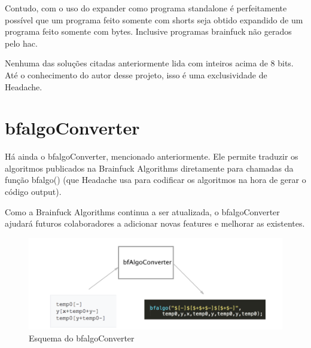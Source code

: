 Contudo, com o uso do expander como programa standalone é perfeitamente possível que um programa feito somente com shorts seja obtido expandido de um programa feito somente com bytes. Inclusive programas brainfuck não gerados pelo hac.

Nenhuma das soluções citadas anteriormente lida com inteiros acima de 8 bits. Até o conhecimento do autor desse projeto, isso é uma exclusividade de Headache.

\section{bfalgoConverter}

Há ainda o bfalgoConverter, mencionado anteriormente. Ele permite traduzir os algoritmos publicados na Brainfuck Algorithms diretamente para chamadas da função bfalgo() (que Headache usa para codificar os algoritmos na hora de gerar o código output).

Como a Brainfuck Algorithms continua a ser atualizada, o bfalgoConverter ajudará futuros colaboradores a adicionar novas features e melhorar as existentes.

\begin{figure}[h]
    \centering
	\includegraphics[]{TD/img/bfalgo.png}
	\caption{Esquema do bfalgoConverter}
	\label{Bfalgo}
\end{figure}